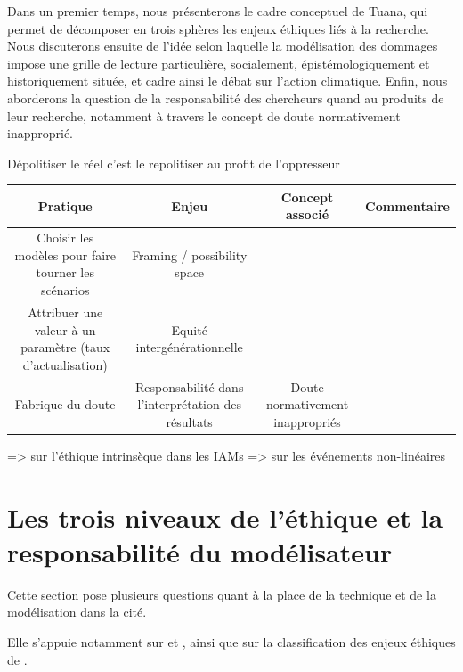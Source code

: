 Dans un premier temps, nous présenterons le cadre conceptuel de Tuana, qui permet de décomposer en trois sphères les enjeux éthiques liés à la recherche. Nous discuterons ensuite de l'idée selon laquelle la modélisation des dommages impose une grille de lecture particulière, socialement, épistémologiquement et historiquement située, et cadre ainsi le débat sur l'action climatique. Enfin, nous aborderons la question de la responsabilité des chercheurs quand au produits de leur recherche, notamment à travers le concept de doute normativement inapproprié. 








\begin{displayquote}
    Dépolitiser le réel c'est le repolitiser au profit de l'oppresseur
\end{displayquote}


\begin{table}
    \centering
    \begin{tabular}{|c|c|c|c|} \hline 
         Pratique&  Enjeu&  Concept associé& Commentaire\\ \hline 
         Choisir les modèles pour faire tourner les scénarios&  Framing / possibility space&  & \\ \hline 
         Attribuer une valeur à un paramètre (taux d'actualisation)&  Equité intergénérationnelle&  & \\ \hline 
         Fabrique du doute&  Responsabilité dans l'interprétation des résultats&  Doute normativement inappropriés& \\ \hline
    \end{tabular}
    \label{tab:ethique}
\end{table}


\cite{schienke_intrinsic_2011} => sur l'éthique intrinsèque dans les IAMs
\cite{weitzman_modeling_2009} => sur les événements non-linéaires



\section{Les trois niveaux de l'éthique et la responsabilité du modélisateur}

Cette section pose plusieurs questions quant à la place de la technique et de la modélisation dans la cité. 

Elle s'appuie notamment sur \cite{jonas_principe_2008} et \cite{vast machine}, ainsi que sur la classification des enjeux éthiques de \cite{tuana_leading_2010}.


